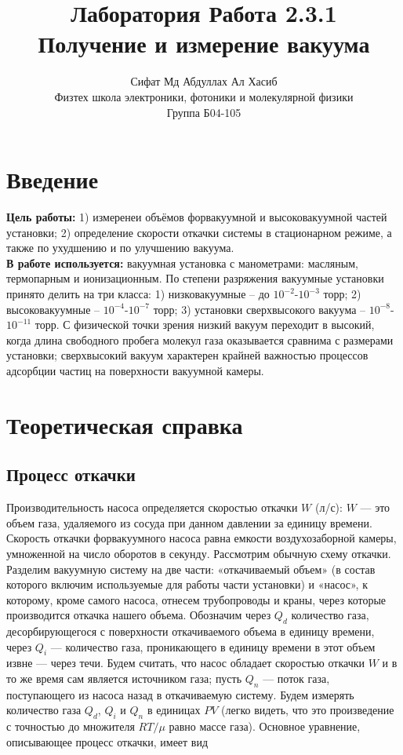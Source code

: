 \documentclass[a4paper, 12pt]{article}%
\author{Сифат Мд Абдуллах Ал Хасиб \\
Физтех школа электроники, фотоники и молекулярной физики \\
Группа Б04-105}
\title{\textbf{Лаборатория Работа 2.3.1 \\ 
Получение и измерение вакуума}}
\begin{document}
\maketitle
\section{Введение}\textbf{Цель работы:} 1) измеренеи объёмов форвакуумной и высоковакуумной частей установки; 2) определение скорости откачки системы в стационарном режиме, а также по ухудшению и по улучшению вакуума. \\
\textbf{В работе используется:} вакуумная установка с манометрами: масляным, термопарным и ионизационным. По степени разряжения вакуумные установки принято делить на три класса: 1) низковакуумные -- до $10^{-2}$-$10^{-3}$ торр; 2) высоковакуумные -- $10^{-4}$-$10^{-7}$ торр; 3) установки сверхвысокого вакуума -- $10^{-8}$-$10^{-11}$ торр. С физической точки зрения низкий вакуум переходит в высокий, когда длина свободного пробега молекул газа оказывается сравнима с размерами установки; сверхвысокий вакуум характерен крайней важностью процессов адсорбции частиц на поверхности вакуумной камеры.
\section{Теоретическая справка} 
\subsection{Процесс откачки}
	Производительность насоса определяется скоростью откачки $W$ (л/с): $W$ — это объем газа, удаляемого из сосуда при данном давлении за единицу времени. Скорость откачки форвакуумного насоса равна емкости воздухозаборной камеры, умноженной на число оборотов в секунду.
Рассмотрим обычную схему откачки. Разделим вакуумную систему на две части: «откачиваемый объем» (в состав которого включим используемые для работы части установки) и «насос», к которому, кроме самого насоса, отнесем трубопроводы и краны, через которые
производится откачка нашего объема. Обозначим через $Q_d$ количество газа, десорбирующегося с поверхности откачиваемого объема в единицу времени, через $Q_i$ — количество газа, проникающего в единицу времени в этот объем извне — через течи. Будем считать, что насос обладает скоростью откачки $W$ и в то же время сам является источником газа; пусть $Q_n$ — поток газа, поступающего из насоса назад в откачиваемую систему. Будем измерять количество газа $Q_d$, $Q_i$ и $Q_n$ в единицах $PV$ (легко видеть, что это произведение с точностью до множителя $RT/ \mu$ равно массе газа). Основное уравнение, описывающее процесс откачки, имеет вид
\end{document}
